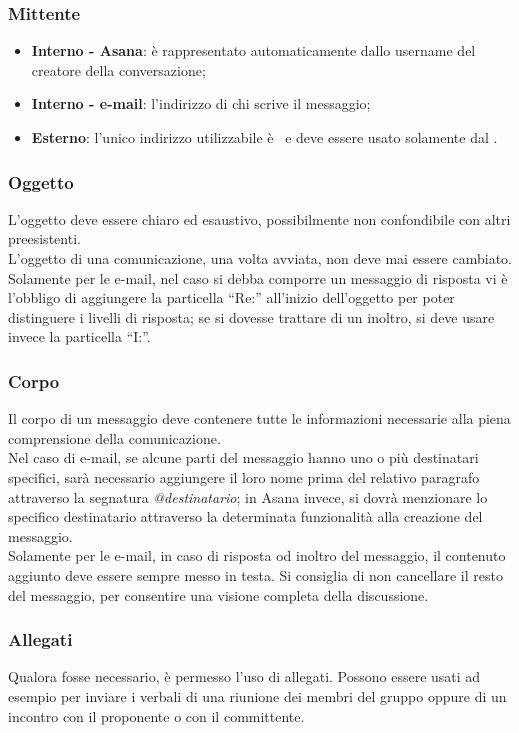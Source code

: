 \documentclass[../NormeDiProgetto.tex]{subfiles}
\begin{document}
				\subsubsection{Mittente}
					\begin{itemize}
						\item \textbf{Interno - Asana}: è rappresentato automaticamente
						dallo username del creatore della conversazione;
						\item \textbf{Interno - e-mail}: l'indirizzo di chi scrive
						il messaggio;
						\item \textbf{Esterno}: l'unico indirizzo utilizzabile è
						\mailkaleidoscode\ e deve essere usato solamente dal
						\responsabilediprogetto.
					\end{itemize}
				\subsubsection{Oggetto}
					L'oggetto deve essere chiaro ed esaustivo, possibilmente non
					confondibile con altri preesistenti.\\
					L'oggetto di una comunicazione, una volta avviata, non deve mai essere cambiato.\\
					Solamente per le e-mail, nel caso si debba
					comporre un messaggio di risposta vi è l'obbligo di aggiungere la
					particella ``Re:'' all'inizio dell'oggetto per poter distinguere i
					livelli di risposta; se si dovesse trattare di un inoltro, si deve
					usare invece la particella ``I:''.
				\subsubsection{Corpo}
					Il corpo di un messaggio deve contenere tutte le informazioni
					necessarie alla piena comprensione della comunicazione.\\
					Nel caso di e-mail, se alcune parti del messaggio hanno uno o più destinatari specifici,
					sarà necessario aggiungere il loro nome	prima del relativo paragrafo
					attraverso la segnatura	\textit{@destinatario};
					in Asana invece, si dovrà menzionare lo specifico destinatario
					attraverso la determinata funzionalità alla creazione del messaggio.\\
					Solamente per le e-mail, in caso di risposta od inoltro del
					messaggio, il contenuto aggiunto deve essere sempre messo in testa.
					Si consiglia di non cancellare il resto del messaggio,
					per consentire una visione completa della discussione.
				\subsubsection{Allegati}
					Qualora fosse necessario, è permesso l'uso di allegati. Possono
					essere usati ad esempio per inviare i verbali di una riunione dei
					membri del gruppo oppure di un incontro con il proponente o con
					il committente.
					
\end{document}
